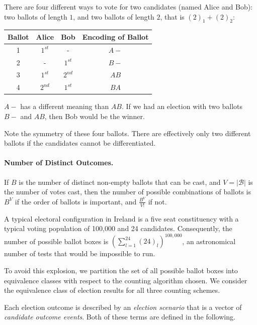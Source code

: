 \documentclass[runningheads,a4paper]{llncs}
\newcommand{\ballots}{\ensuremath{\mathcal{B}}\xspace}
\newcommand{\ballottwo}[2]{\ensuremath{\boxed{#1}\boxed{#2}}}
\newcommand{\first}{$1^{st}$\xspace}
\newcommand{\second}{$2^{nd}$\xspace}
\begin{document}
There are four different ways to vote for two candidates (named Alice
and Bob): two ballots of length $1$, and two ballots of length $2$,
that is $\displaystyle {{(2)}_{1}} + {{(2)}_{2}}$:
\begin{center}
  \begin{longtable}{c|c|c|c}
    Ballot & Alice & Bob & Encoding of Ballot\\ 
    \hline
    1 & \first & - & $\ballottwo{A}{-}$ \\ 
    2 & - & \first & $\ballottwo{B}{-}$ \\
    3 & \first & \second & $\ballottwo{A}{B}$ \\
    4 & \second & \first & $\ballottwo{B}{A}$
  \end{longtable}
\end{center}
$\ballottwo{A}{-}$ has a different meaning than $\ballottwo{A}{B}$.
If we had an election with two ballots $\ballottwo{B}{-}$ and
$\ballottwo{A}{B}$, then Bob would be the winner.

Note the symmetry of these four ballots.  There are effectively only
two different ballots if the candidates cannot be differentiated.

\paragraph{Number of Distinct Outcomes.}

If $B$ is the number of distinct non-empty ballots that can be cast,
and $V=|\ballots|$ is the number of votes cast, then the number of
possible combinations of ballots is $\displaystyle B^V$ if the order
of ballots is important, and $\displaystyle \frac{B^V}{V!}$ if not.

A typical electoral configuration in Ireland is a five seat
constituency with a typical voting population of 100,000 and 24
candidates.  Consequently, the number of possible ballot boxes is
$\displaystyle{(\sum_{l=1}^{24}{{(24)}_{l}})^{100,000}}$, an
astronomical number of tests that would be impossible to run.

To avoid this explosion, we partition the set of all possible ballot
boxes into equivalence classes with respect to the counting algorithm
chosen.  We consider the equivalence class of election results for all
three counting schemes.

Each election outcome is described by an \emph{election scenario}
that is a vector of \emph{candidate outcome events}.  Both of these
terms are defined in the following.
\end{document}
